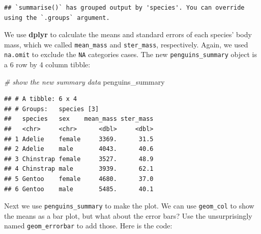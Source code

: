 \documentclass[
]{book}
\newenvironment{Shaded}{\begin{snugshade}}{\end{snugshade}}
\newcommand{\CommentTok}[1]{\textcolor[rgb]{0.56,0.35,0.01}{\textit{#1}}}
\newcommand{\NormalTok}[1]{#1}
\begin{document}
\begin{verbatim}
## `summarise()` has grouped output by 'species'. You can override using the `.groups` argument.
\end{verbatim}

We use \textbf{dplyr} to calculate the means and standard errors of each species' body mass, which we called \texttt{mean\_mass} and \texttt{ster\_mass}, respectively. Again, we used \texttt{na.omit} to exclude the \texttt{NA} categories cases. The new \texttt{penguins\_summary} object is a 6 row by 4 column tibble:

\begin{Shaded}
\begin{Highlighting}[]
\CommentTok{\# show the new summary data}
\NormalTok{penguins\_summary}
\end{Highlighting}
\end{Shaded}

\begin{verbatim}
## # A tibble: 6 x 4
## # Groups:   species [3]
##   species   sex    mean_mass ster_mass
##   <chr>     <chr>      <dbl>     <dbl>
## 1 Adelie    female     3369.      31.5
## 2 Adelie    male       4043.      40.6
## 3 Chinstrap female     3527.      48.9
## 4 Chinstrap male       3939.      62.1
## 5 Gentoo    female     4680.      37.0
## 6 Gentoo    male       5485.      40.1
\end{verbatim}

Next we use \texttt{penguins\_summary} to make the plot. We can use \texttt{geom\_col} to show the means as a bar plot, but what about the error bars? Use the unsurprisingly named \texttt{geom\_errorbar} to add those. Here is the code:
\end{document}
